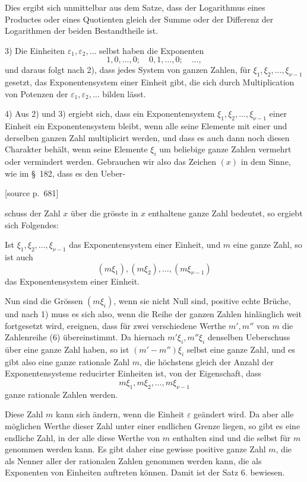 \documentclass[11pt]{article}
\newcommand{\srcpage}[1]{\par\medskip\noindent\textsf{[source p.~#1]}\par\smallskip}
\begin{document}
Dies ergibt sich unmittelbar aus dem Satze, dass der Logarithmus eines Productes oder eines Quotienten gleich der Summe oder der Differenz der Logarithmen der beiden Bestandtheile ist.

3) Die Einheiten $\varepsilon_1,\varepsilon_2,\ldots$ selbst haben die Exponenten
\[
1,0,\ldots,0;\quad 0,1,\ldots,0;\quad\ldots,
\]
und daraus folgt nach 2), dass jedes System von ganzen Zahlen, für $\xi_1,\xi_2,\ldots,\xi_{\nu-1}$ gesetzt, das Exponentensystem einer Einheit gibt, die sich durch Multiplication von Potenzen der $\varepsilon_1,\varepsilon_2,\ldots$ bilden lässt.

4) Aus 2) und 3) ergiebt sich, dass ein Exponentensystem $\xi_1,\xi_2,\ldots,\xi_{\nu-1}$ einer Einheit ein Exponentensystem bleibt, wenn alle seine Elemente mit einer und derselben ganzen Zahl multiplicirt werden, und dass es auch dann noch diesen Charakter behält, wenn seine Elemente $\xi_i$ um beliebige ganze Zahlen vermehrt oder vermindert werden. Gebrauchen wir also das Zeichen $(x)$ in dem Sinne, wie im \S~182, dass es den Ueber-
\srcpage{681}
schuss der Zahl $x$ über die grösste in $x$ enthaltene ganze Zahl bedeutet, so ergiebt sich Folgendes:

Ist $\xi_1,\xi_2,\ldots,\xi_{\nu-1}$ das Exponentensystem einer Einheit, und $m$ eine ganze Zahl, so ist auch
\begin{equation}
(m\xi_1),(m\xi_2),\ldots,(m\xi_{\nu-1})
\tag{6}
\end{equation}
das Exponentensystem einer Einheit.

Nun sind die Grössen $(m\xi_i)$, wenn sie nicht Null sind, positive echte Brüche, und nach 1) muss es sich also, wenn die Reihe der ganzen Zahlen hinlänglich weit fortgesetzt wird, ereignen, dass für zwei verschiedene Werthe $m',m''$ von $m$ die Zahlenreihe (6) übereinstimmt. Da hiernach $m'\xi_i,m''\xi_i$ denselben Ueberschuss über eine ganze Zahl haben, so ist $(m'-m'')\xi_i$ selbst eine ganze Zahl, und es gibt also eine ganze rationale Zahl $m$, die höchstens gleich der Anzahl der Exponentensysteme reducirter Einheiten ist, von der Eigenschaft, dass
\[
m\xi_1,m\xi_2,\ldots,m\xi_{\nu-1}
\]
ganze rationale Zahlen werden.

Diese Zahl $m$ kann sich ändern, wenn die Einheit $\varepsilon$ geändert wird. Da aber alle möglichen Werthe dieser Zahl unter einer endlichen Grenze liegen, so gibt es eine endliche Zahl, in der alle diese Werthe von $m$ enthalten sind und die selbst für $m$ genommen werden kann. Es gibt daher eine gewisse positive ganze Zahl $m$, die als Nenner aller der rationalen Zahlen genommen werden kann, die als Exponenten von Einheiten auftreten können. Damit ist der Satz 6. bewiesen.
\end{document}
